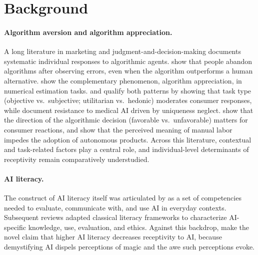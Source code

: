 \documentclass[11pt]{article}
\begin{document}
\section{Background}

\paragraph{Algorithm aversion and algorithm appreciation.} A long literature in
marketing and judgment-and-decision-making documents systematic individual
responses to algorithmic agents. \citet{dietvorst2015algorithm} show that
people abandon algorithms after observing errors, even when the algorithm
outperforms a human alternative. \citet{logg2019algorithm} show the
complementary phenomenon, algorithm appreciation, in numerical estimation
tasks. \citet{castelo2019taskdependent} and \citet{longoni2022wordofmachine}
qualify both patterns by showing that task type (objective vs.\ subjective;
utilitarian vs.\ hedonic) moderates consumer responses, while
\citet{longoni2019resistance} document resistance to medical AI driven by
uniqueness neglect. \citet{yalcin2022thumbs} show that the direction of the
algorithmic decision (favorable vs.\ unfavorable) matters for consumer
reactions, and \citet{debellis2023meaning} show that the perceived meaning of
manual labor impedes the adoption of autonomous products. Across this
literature, contextual and task-related factors play a central role, and
individual-level determinants of receptivity remain comparatively
understudied.

\paragraph{AI literacy.} The construct of AI literacy itself was articulated
by \citet{long2020aileiteracy} as a set of competencies needed to evaluate,
communicate with, and use AI in everyday contexts. Subsequent reviews
\citep{ng2021conceptualizing} adapted classical literacy frameworks to
characterize AI-specific knowledge, use, evaluation, and ethics. Against this
backdrop, \citet{tully2025lower} make the novel claim that higher AI literacy
decreases receptivity to AI, because demystifying AI dispels
perceptions of magic and the awe such perceptions evoke.
\end{document}
